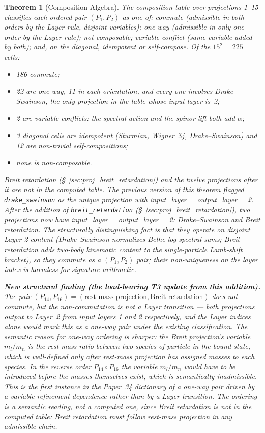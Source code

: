 \documentclass[11pt]{article}
\newtheorem{theorem}{Theorem}
\begin{document}
\begin{theorem}[Composition Algebra]
\label{thm:composition_algebra}
The composition table over projections 1--15 classifies each
ordered pair $(P_1, P_2)$ as one of: \emph{commute} (admissible in
both orders by the Layer rule, disjoint variables); \emph{one-way}
(admissible in only one order by the Layer rule); \emph{not
composable}; \emph{variable conflict} (same variable added by both);
and, on the diagonal, \emph{idempotent} or \emph{self-compose}.  Of
the $15^2 = 225$ cells:
\begin{itemize}
\setlength\itemsep{0pt}
\item 186 commute;
\item 22 are one-way, 11 in each orientation, and every one involves
Drake--Swainson, the only projection in the table whose input layer
is~2;
\item 2 are variable conflicts: the spectral action and the spinor
lift both add $\alpha$;
\item 3 diagonal cells are idempotent (Sturmian, Wigner~$3j$,
Drake--Swainson) and 12 are non-trivial self-compositions;
\item none is non-composable.
\end{itemize}
Breit retardation (\S~\ref{sec:proj_breit_retardation}) and the
twelve projections after it are not in the computed table.
The previous version of this theorem flagged \texttt{drake\_swainson}
as the unique projection with input\_layer = output\_layer = 2.
After the addition of \texttt{breit\_retardation}
(\S~\ref{sec:proj_breit_retardation}), \emph{two} projections now
have input\_layer = output\_layer = 2: Drake--Swainson and Breit
retardation.  The structurally distinguishing fact is that they
operate on disjoint Layer-2 content (Drake--Swainson normalizes
Bethe-log spectral sums; Breit retardation adds two-body
kinematic content to the single-particle Lamb-shift
bracket), so they commute as a $(P_1, P_2)$ pair; their
non-uniqueness on the layer index is harmless for signature
arithmetic.

\textbf{New structural finding (the load-bearing T3 update from
this addition).}  The pair
$(P_{14}, P_{16}) = (\text{rest-mass projection},
\text{Breit retardation})$ does \emph{not} commute, but the
non-commutation is \emph{not} a Layer transition --- both projections
output to Layer~2 from input layers 1 and 2 respectively, and the
Layer indices alone would mark this as a one-way pair under the
existing classification.  The \emph{semantic} reason for one-way
ordering is sharper: the Breit projection's variable $m_l/m_n$ is
the rest-mass ratio between two species of particle in the bound
state, which is well-defined only after rest-mass projection has
assigned masses to each species.  In the reverse order
$P_{14} \circ P_{16}$ the variable $m_l/m_n$ would have to be
introduced before the masses themselves exist, which is semantically
inadmissible.  This is the first instance in the Paper~34 dictionary
of a one-way pair driven by a \emph{variable refinement} dependence
rather than by a Layer transition.  The ordering is a semantic
reading, not a computed one, since Breit retardation is not in the
computed table: Breit retardation must follow rest-mass projection in
any admissible chain.


\end{theorem}
\end{document}
